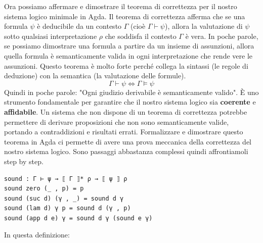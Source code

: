 \documentclass[a4paper]{article}
\theoremstyle{definition}
\theoremstyle{remark}
\begin{document}
Ora possiamo affermare e dimostrare il teorema di correttezza per il nostro sistema logico minimale in Agda.
Il teorema di correttezza afferma che se una formula \( ψ \) è deducibile da un contesto \( Γ \) (cioè \( Γ ⊢ ψ \)),
allora la valutazione di \( ψ \) sotto qualsiasi interpretazione \( ρ \) che soddisfa il contesto \( Γ \) è vera.
In poche parole, se possiamo dimostrare una formula a partire da un insieme di assunzioni,
allora quella formula è semanticamente valida in ogni interpretazione che rende vere le assunzioni.
Questo teorema è molto forte perché collega la sintassi (le regole di deduzione) con la semantica (la valutazione delle formule).
\[\Gamma \vdash \psi \iff \Gamma \vDash \psi\]
Quindi in poche parole: "Ogni giudizio derivabile è semanticamente valido".
È uno strumento fondamentale per garantire che il nostro sistema logico sia \textbf{coerente} e \textbf{affidabile}.
Un sistema che non dispone di un teorema di correttezza potrebbe permettere di derivare proposizioni che non sono semanticamente valide,
portando a contraddizioni e risultati errati.
Formalizzare e dimostrare questo teorema in Agda ci permette di avere una prova meccanica della correttezza del nostro sistema logico.
Sono passaggi abbastanza complessi quindi affrontiamoli step by step.
\begin{verbatim}
sound : Γ ⊢ ψ → ⟦ Γ ⟧* ρ → ⟦ ψ ⟧ ρ
sound zero (_ , p) = p
sound (suc d) (γ , _) = sound d γ
sound (lam d) γ p = sound d (γ , p)
sound (app d e) γ = sound d γ (sound e γ)
\end{verbatim}
In questa definizione:
\end{document}
